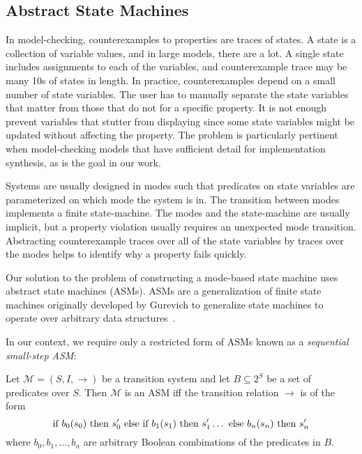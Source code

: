 \documentclass{llncs/llncs}
\begin{document}
\subsection{Abstract State Machines}\label{sec:abstract}\label{sec:asms}
In model-checking, counterexamples to properties are traces of states. A state is a collection of variable values, and in large models, there are a lot. A single state includes assignments to each of the variables, and counterexample trace may be many 10s of states in length. In practice, counterexamples depend on a small number of state variables. The user has to manually separate the state variables that matter from those that do not for a specific property. It is not enough prevent variables that stutter from displaying since some state variables might be updated without affecting the property. The problem is particularly pertinent when model-checking models that have sufficient detail for implementation synthesis, as is the goal in our work.

Systems are usually designed in modes such that predicates on state variables are parameterized on which mode the system is in. The transition between modes implements a finite state-machine. The modes and the state-machine are usually implicit, but a property violation usually requires an unexpected mode transition. Abstracting counterexample traces over all of the state variables by traces over the modes helps to identify why a property fails quickly.

Our solution to the problem of constructing a mode-based state machine uses abstract state machines (ASMs). ASMs are a generalization of finite state machines originally developed by Gurevich to generalize state machines to operate over arbitrary data structures~\cite{asm}.

In our context, we require only a restricted form of ASMs known as a \emph{sequential small-step ASM}:

\begin{definition}
Let $\mathcal{M} = (S, I, \rightarrow)$ be a transition system and let $B \subseteq 2^S$ be a set of predicates over $S$. Then $\mathcal{M}$ is an ASM iff the transition relation $\rightarrow$ is of the form
$$\textnormal{if } b_0(s_0) \textnormal{ then } s'_0 \textnormal{ else if } b_1(s_1) \textnormal{ then } s'_1 \ldots \textnormal{ else } b_n(s_n) \textnormal{ then } s'_n$$
\noindent
where $b_0, b_1, \ldots, b_n$ are arbitrary Boolean combinations of the predicates in $B$.
\end{definition}
\end{document}
